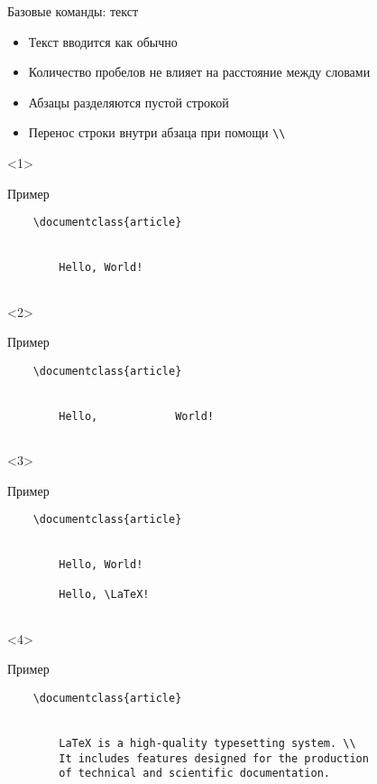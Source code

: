 
\begin{frame}[fragile]{Базовые команды: текст}

\begin{itemize}[<+->]
    \item Текст вводится как обычно
    \item Количество пробелов не влияет на расстояние между словами
    \item Абзацы разделяются пустой строкой
    \item Перенос строки внутри абзаца при помощи \lstinline!\\!
\end{itemize}

\begin{onlyenv}<1>
    \begin{block}{Пример}
        \begin{lstlisting}
    \documentclass{article}
    
    
        Hello, World!
    
        \end{lstlisting}
    \end{block}
\end{onlyenv}

\begin{onlyenv}<2>
    \begin{block}{Пример}
        \begin{lstlisting}
    \documentclass{article}
    
    
        Hello,            World!
    
        \end{lstlisting}
    \end{block}
\end{onlyenv}

\begin{onlyenv}<3>
    \begin{block}{Пример}
        \begin{lstlisting}
    \documentclass{article}
    
    
        Hello, World!
        
        Hello, \LaTeX!
    
        \end{lstlisting}
    \end{block}
\end{onlyenv}

\begin{onlyenv}<4>
    \begin{block}{Пример}
        \begin{lstlisting}
    \documentclass{article}
    
    
        LaTeX is a high-quality typesetting system. \\
        It includes features designed for the production 
        of technical and scientific documentation. 
    
        \end{lstlisting}
    \end{block}
\end{onlyenv}

\end{frame}

